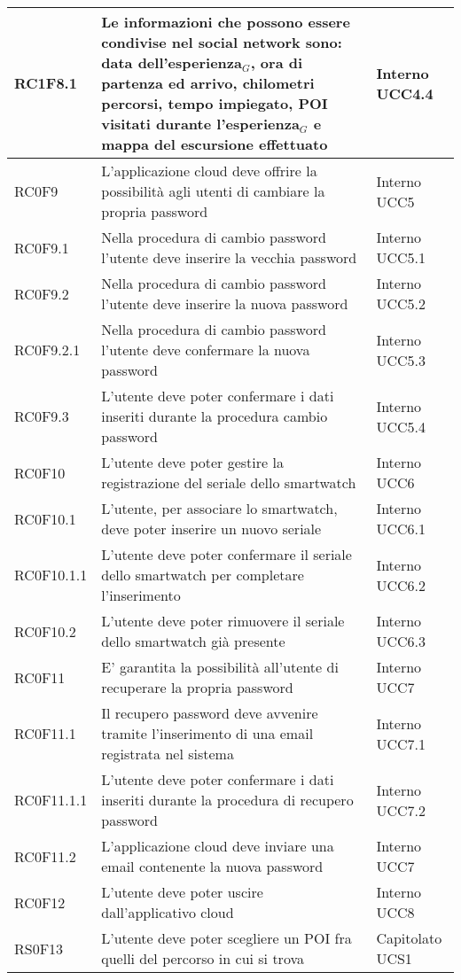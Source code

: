 \begin{center}
\begin{longtable}{|l|p{7cm}|p{1.7cm}|}
RC1F8.1		& Le informazioni che possono essere condivise nel social network sono: data dell'esperienza$_{G}$, ora di partenza ed arrivo, chilometri percorsi, tempo impiegato, POI visitati durante l'esperienza$_{G}$ e mappa del escursione effettuato & Interno UCC4.4 \\\hline
RC0F9		& L'applicazione cloud deve offrire la possibilità agli utenti di cambiare la propria password & Interno UCC5 \\\hline
RC0F9.1		& Nella procedura di cambio password l'utente deve inserire la vecchia password & Interno UCC5.1 \\\hline
RC0F9.2		& Nella procedura di cambio password l'utente deve inserire la nuova password & Interno UCC5.2 \\\hline
RC0F9.2.1	& Nella procedura di cambio password l'utente deve confermare la nuova password & Interno UCC5.3 \\\hline
RC0F9.3		& L'utente deve poter confermare i dati inseriti durante la procedura cambio password & Interno UCC5.4 \\\hline
RC0F10		& L'utente deve poter gestire la registrazione del seriale dello smartwatch & Interno UCC6 \\\hline
RC0F10.1	& L'utente, per associare lo smartwatch, deve poter inserire un nuovo seriale & Interno UCC6.1 \\\hline
RC0F10.1.1	& L'utente deve poter confermare il seriale dello smartwatch per completare l'inserimento & Interno UCC6.2 \\\hline
RC0F10.2	& L'utente deve poter rimuovere il seriale dello smartwatch già presente & Interno UCC6.3 \\\hline
RC0F11		& E' garantita la possibilità all'utente di recuperare la propria password & Interno UCC7 \\\hline
RC0F11.1	& Il recupero password deve avvenire tramite l'inserimento di una email registrata nel sistema & Interno UCC7.1 \\\hline
RC0F11.1.1	& L'utente deve poter confermare i dati inseriti durante la procedura di recupero password & Interno UCC7.2 \\\hline
RC0F11.2	& L'applicazione cloud deve inviare una email contenente la nuova password & Interno UCC7 \\\hline
RC0F12		& L'utente deve poter uscire dall'applicativo cloud & Interno UCC8 \\\hline
RS0F13		& L'utente deve poter scegliere un POI fra quelli del percorso in cui si trova & Capitolato UCS1\\\hline

\end{longtable}
\end{center}
